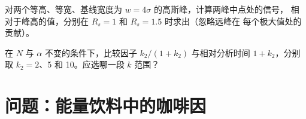 \begin{exercise}[$\star\star\star$]\label{exo:b2:chromatography:11}
对两个等高、等宽、基线宽度为 $w = 4\sigma$ 的高斯峰，计算两峰中点处的信号，
相对于峰高的值，分别在 $R_s = 1$ 和 $R_s = 1.5$ 时求出（忽略远峰在
每个极大值处的贡献）。
\end{exercise}

\begin{exercise}[$\star\star\star$]\label{exo:b2:chromatography:12}
在 $N$ 与 $\alpha$ 不变的条件下，比较因子 $k_2/(1+k_2)$ 与相对分析时间
$1 + k_2$，分别取 $k_2 = 2$、5 和 10。应选哪一段 $k$ 范围？
\end{exercise}

\section{问题：能量饮料中的咖啡因}

